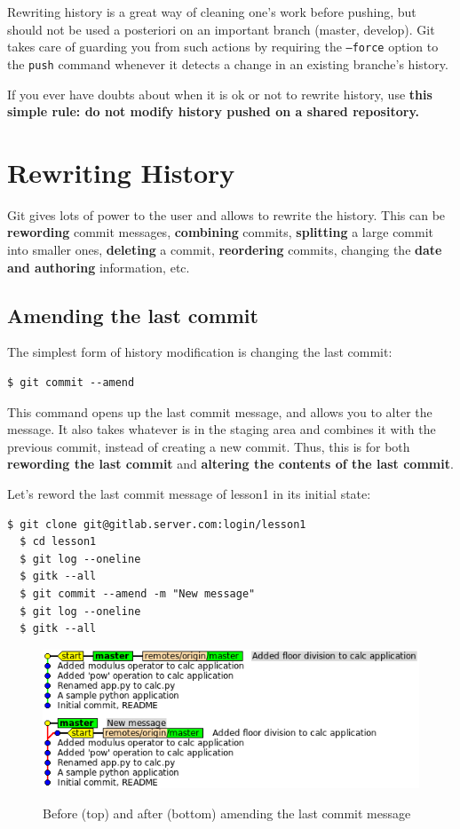 \documentclass{../../common/tufte-latex/tufte-handout}
\begin{document}
Rewriting history is a great way of cleaning one's work before pushing, but should not be used a posteriori on an important branch (master, develop).  Git takes care of guarding you from such actions by requiring the \texttt{--force} option to the \texttt{push} command whenever it detects a change in an existing branche's history.

If you ever have doubts about when it is ok or not to rewrite history, use \textbf{this simple rule: do not modify history pushed on a shared repository.}

\section{Rewriting History}
Git gives lots of power to the user and allows to rewrite the history.
This can be \textbf{rewording} commit messages, \textbf{combining} commits, \textbf{splitting} a large commit into smaller ones, \textbf{deleting} a commit, \textbf{reordering} commits, changing the \textbf{date and authoring} information, etc.

\subsection{Amending the last commit}
The simplest form of history modification is changing the last commit:

\begin{lstlisting}[style=BashInputStyle]
  $ git commit --amend
\end{lstlisting}

This command opens up the last commit message, and allows you to alter the message.
It also takes whatever is in the staging area and combines it with the previous commit, instead of creating a new commit.
Thus, this is for both \textbf{rewording the last commit} and \textbf{altering the contents of the last commit}.

Let's reword the last commit message of lesson1 in its initial state:

\begin{lstlisting}[style=BashInputStyle]
  $ git clone git@gitlab.server.com:login/lesson1
  $ cd lesson1
  $ git log --oneline
  $ gitk --all
  $ git commit --amend -m "New message"
  $ git log --oneline
  $ gitk --all
\end{lstlisting}

\begin{figure}%
  \centering
  \includegraphics[width=0.85\linewidth]{gitcommit-amend.png}
  \label{fig:gitcommit-amend}
  \caption{Before (top) and after (bottom) amending the last commit message}
\end{figure}
\end{document}
